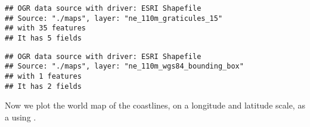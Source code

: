 \documentclass[paper=a4,10pt,div=17,headsepline,BCOR=12mm,twoside,open=right]{scrbook}\usepackage{knitr}
\begin{document}
\begin{knitrout}\footnotesize
{}\color{fgcolor}\begin{kframe}
\begin{alltt}
 \hlkwb{<-} \hlstd{(}\hlstd{,} \hlstd{=}\hlstd{)}
\end{alltt}
\begin{verbatim}
## OGR data source with driver: ESRI Shapefile 
## Source: "./maps", layer: "ne_110m_graticules_15"
## with 35 features
## It has 5 fields
\end{verbatim}
\begin{alltt}
 \hlkwb{<-} 
 \hlkwb{<-}  \hlstd{(}\hlstd{))}
 \hlkwb{<-} 

 \hlkwb{<-} \hlstd{(}\hlstd{,} \hlstd{=}\hlstd{)}
\end{alltt}
\begin{verbatim}
## OGR data source with driver: ESRI Shapefile 
## Source: "./maps", layer: "ne_110m_wgs84_bounding_box"
## with 1 features
## It has 2 fields
\end{verbatim}
\begin{alltt}
 \hlkwb{<-} 
\end{alltt}


{\ttfamily\noindent\itshape\color{messagecolor}{\#\# Regions defined for each Polygons}}\begin{alltt}
 \hlkwb{<-}  \hlstd{(}\hlstd{))}
 \hlkwb{<-} 
\end{alltt}


{\ttfamily\noindent\itshape\color{messagecolor}{\#\# Regions defined for each Polygons}}\end{kframe}
\end{knitrout}

Now we plot the world map of the coastlines, on a longitude and latitude scale, as a  using .
\end{document}
